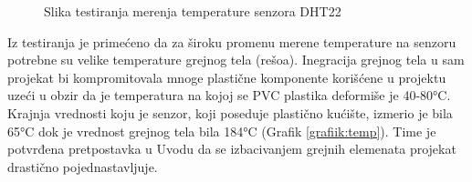 \documentclass[a4paper, 12pt]{article}
\begin{document}
\begin{figure}[H]
\centering
{}
\caption{Slika testiranja merenja temperature senzora DHT22} \label{fig:test_temp}
\end{figure}

\pagebreak

Iz testiranja je primećeno da za široku promenu merene temperature na senzoru potrebne su velike temperature grejnog tela (rešoa). Inegracija grejnog tela u sam projekat bi kompromitovala mnoge plastične komponente korišćene u projektu uzeći u obzir da je temperatura na kojoj se PVC plastika deformiše je 40-80°C. Krajnja vrednosti koju je senzor, koji poseduje plastično kućište, izmerio je bila 65°C dok je vrednost grejnog tela bila 184°C (Grafik \ref{grafiik:temp}). Time je potvrđena pretpostavka u Uvodu da se izbacivanjem grejnih elemenata projekat drastično pojednastavljuje. 

\vspace{10pt}

\begin{grafik}
\begin{center}
\end{center}			
\caption{Testiranja merenja temperature senzora DHT22}\label{grafiik:temp}
\end{grafik}
%
%
%
%
\pagebreak
\endgroup
\end{document}
